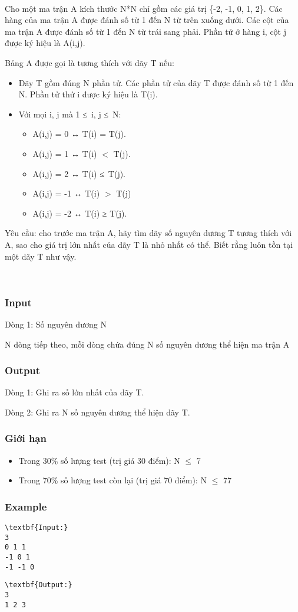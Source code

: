 

 

Cho một ma trận A kích thước N*N chỉ gồm các giá trị \{-2, -1, 0, 1, 2\}. Các hàng của ma trận A được đánh số từ 1 đến N từ trên xuống dưới. Các cột của ma trận A được đánh số từ 1 đến N từ trái sang phải. Phần tử ở hàng i, cột j được ký hiệu là A(i,j).

Bảng A được gọi là tương thích với dãy T nếu:
\begin{itemize}
	\item Dãy T gồm đúng N phần tử. Các phần tử của dãy T được đánh số từ 1 đến N. Phần tử thứ i được ký hiệu là T(i).
	\item Với mọi i, j mà 1 ≤ i, j ≤ N:
\begin{itemize}
	\item A(i,j) = 0 ↔ T(i) = T(j).
	\item A(i,j) = 1 ↔ T(i) $<$ T(j).
	\item A(i,j) = 2 ↔ T(i) ≤ T(j).
	\item A(i,j) = -1 ↔ T(i) $>$ T(j)
	\item A(i,j) = -2 ↔ T(i) ≥ T(j).
\end{itemize}
\end{itemize}

Yêu cầu: cho trước ma trận A, hãy tìm dãy số nguyên dương T tương thích với A, sao cho giá trị lớn nhất của dãy T là nhỏ nhất có thể. Biết rằng luôn tồn tại một dãy T như vậy.

 

\subsubsection{Input}

Dòng 1: Số nguyên dương N

N dòng tiếp theo, mỗi dòng chứa đúng N số nguyên dương thể hiện ma trận A

\subsubsection{Output}

Dòng 1: Ghi ra số lớn nhất của dãy T.

Dòng 2: Ghi ra N số nguyên dương thể hiện dãy T.

\subsubsection{Giới hạn}
\begin{itemize}
	\item Trong 30\% số lượng test (trị giá 30 điểm): N  $\le$  7
	\item Trong 70\% số lượng test còn lại (trị giá 70 điểm): N  $\le$  77
\end{itemize}

\subsubsection{Example}
\begin{verbatim}
\textbf{Input:}
3
0 1 1
-1 0 1
-1 -1 0\end{verbatim}
\begin{verbatim}
\textbf{Output:}
3
1 2 3\end{verbatim}
